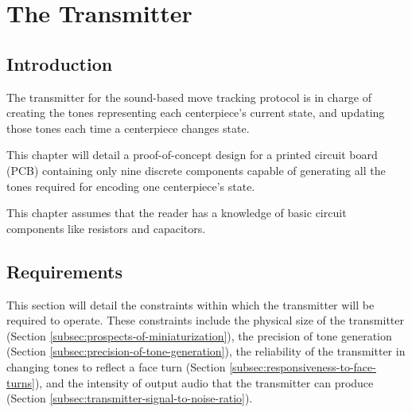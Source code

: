 
\chapter{The Transmitter} %
\label{Chapter6} 


\section{Introduction}
The transmitter for the sound-based move tracking protocol is in charge of creating the tones representing each centerpiece's current state, and updating those tones each time a centerpiece changes state.

This chapter will detail a proof-of-concept design for a printed circuit board (PCB) containing only nine discrete components capable of generating all the tones required for encoding one centerpiece's state.

This chapter assumes that the reader has a knowledge of basic circuit components like resistors and capacitors.

\section{Requirements}
\label{sec:transmitter-requirements}
This section will detail the constraints within which the transmitter will be required to operate. These constraints include the physical size of the transmitter (Section \ref{subsec:prospects-of-miniaturization}), the precision of tone generation (Section \ref{subsec:precision-of-tone-generation}), the reliability of the transmitter in changing tones to reflect a face turn (Section \ref{subsec:responsiveness-to-face-turns}), and the intensity of output audio that the transmitter can produce (Section \ref{subsec:transmitter-signal-to-noise-ratio}).

